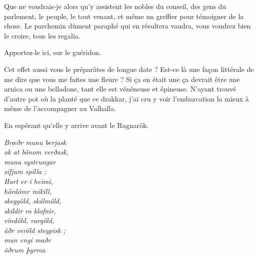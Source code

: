 \begin{drama}
  Que ne voudrais-je alors qu’y assistent les nobles du conseil, des gens du parlement, le peuple, le tout venant, et même un greffier pour témoigner de la chose. Le parchemin dûment paraphé qui en résultera vaudra, vous voudrez bien le croire, tous les regalia.

  \elenaspeaks {} Apportez-le ici, sur le guéridon.


  \reinespeaks Cet effet aussi vous le préparâtes de longue date ? Est-ce là une façon littérale de me dire que vous me faites une fleure ? %
  \elenaspeaks Si ça en était une ça devrait être une arnica ou une belladone, tant elle est  vénéneuse et épineuse. N’ayant trouvé d’autre pot où la planté que ce drakkar, j’ai cru y voir l’embarcation la mieux à même de l’accompagner au Valhalla.


  En espérant qu’elle y arrive avant le Ragnarök.



  \choirspeaks
  \begin{minipage}[t]{\linewidth}
    \em
    Brœðr munu berjask\endnote{\ragnarokendnote}\\
    ok at bönom verðask,\\
    munu systrungar\\
    sifjum spilla ;\\
    Hart er í heimi,\\
    hórdómr mikill,\\
    skeggöld, skálmöld,\\
    skildir ro klofnir,\\
    vindöld, vargöld,\\
    áðr veröld steypisk ;\\
    mun engi maðr\\
    öðrum þyrma
  \end{minipage}
\end{drama}

\scene

\StageDirII{\elena, \ela}


